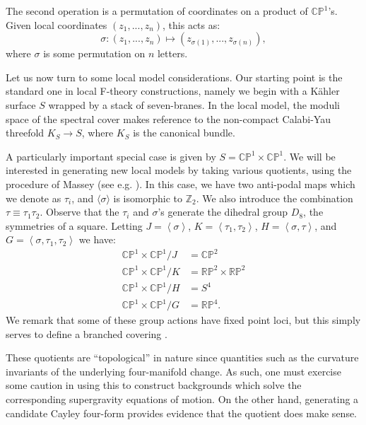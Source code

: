 \documentclass[12pt]{article}%
\numberwithin{equation}{section}
\renewcommand{\(}{\left(}
\renewcommand{\)}{\right)}
\renewcommand{\[}{\left[}
\renewcommand{\]}{\right]}
\begin{document}
The second operation is a permutation of
coordinates on a product of $\mathbb{CP}^{1}$'s. Given local coordinates
$(z_{1},...,z_{n})$, this acts as:%
\begin{equation}
\sigma:(z_{1},...,z_{n})\mapsto(z_{\sigma(1)},...,z_{\sigma(n)}),
\end{equation}
where $\sigma$ is some permutation on $n$ letters.

Let us now turn to some local model considerations. Our starting point is the
standard one in local F-theory constructions, namely we begin with a K\"ahler surface
$S$ wrapped by a stack of seven-branes. In the local model, the moduli space
of the spectral cover makes reference to the non-compact Calabi-Yau threefold
$K_{S}\rightarrow S$, where $K_{S}$ is the canonical bundle.

A particularly important special case is given by $S=\mathbb{CP}%
^{1}\times\mathbb{CP}^{1}$. We will be interested in generating new local
models by taking various quotients, using the procedure of Massey (see e.g.
\cite{Massey, Lawson}). In this case, we have two anti-podal maps which we
denote as $\tau_{i}$, and $\langle \sigma \rangle$ is isomorphic to $\mathbb{Z}_{2}$. We also
introduce the combination $\tau \equiv \tau_{1}\tau_{2}$. Observe that the $\tau_{i}$
and $\sigma$'s generate the dihedral group $D_{8}$, the symmetries of a
square. Letting $J=\left\langle \sigma\right\rangle $, $K=\left\langle
\tau_{1},\tau_{2}\right\rangle $, $H=\left\langle \sigma,\tau\right\rangle $,
and $G=\left\langle \sigma,\tau_{1},\tau_{2}\right\rangle $ we have:%
\begin{align}
\mathbb{CP}^{1}\times\mathbb{CP}^{1}/J  &  =\mathbb{CP}^{2}\\
\mathbb{CP}^{1}\times\mathbb{CP}^{1}/K  &  =\mathbb{RP}^{2} \times \mathbb{RP}^{2}\\
\mathbb{CP}^{1}\times\mathbb{CP}^{1}/H  &  =S^{4}\\
\mathbb{CP}^{1}\times\mathbb{CP}^{1}/G  &  =\mathbb{RP}^{4}\text{.}%
\end{align}
We remark that some of these group actions have fixed point loci,
but this simply serves to define a branched covering \cite{Andreotti1958}.

These quotients are ``topological'' in nature since quantities
such as the curvature invariants of the underlying four-manifold change.
As such, one must exercise some caution in using this to construct backgrounds
which solve the corresponding supergravity equations of motion. On the other
hand, generating a candidate Cayley four-form provides evidence that the
quotient does make sense.
\end{document}
